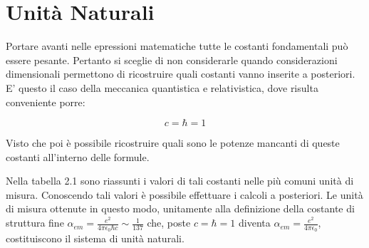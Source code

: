 
\chapter{Unità Naturali}

Portare avanti nelle epressioni matematiche tutte le costanti fondamentali può essere pesante. Pertanto si sceglie di non considerarle quando considerazioni dimensionali permettono di ricostruire quali costanti vanno inserite a posteriori. E' questo il caso della meccanica quantistica e relativistica, dove risulta conveniente porre:

\begin{equation}
c=\hbar=1
\end{equation}

Visto che poi è possibile ricostruire quali sono le potenze mancanti di queste costanti all'interno delle formule.

Nella tabella 2.1 sono riassunti i valori di tali costanti nelle più comuni unità di misura. Conoscendo tali valori è possibile effettuare i calcoli a posteriori.
Le unità di misura ottenute in questo modo, unitamente alla definizione della costante di struttura fine $\alpha_{em}=\frac{e^2}{4\pi\epsilon_0\hbar c}\sim\frac{1}{137}$ che, poste $c=\hbar=1$ diventa $\alpha_{em}=\frac{e^2}{4\pi\epsilon_0}$, costituiscono il sistema di unità naturali.

